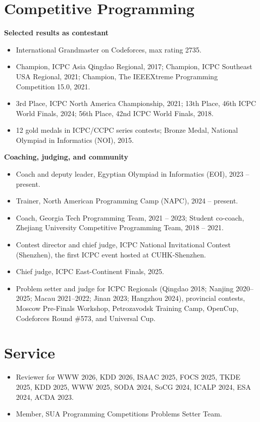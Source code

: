 \documentclass[10pt]{article}
\begin{document}
\section*{Competitive Programming}
\textbf{Selected results as contestant}
\begin{itemize}
  \item International Grandmaster on Codeforces, max rating 2735.
  \item Champion, ICPC Asia Qingdao Regional, 2017; Champion, ICPC Southeast USA Regional, 2021; Champion, The IEEEXtreme Programming Competition 15.0, 2021.
  \item 3rd Place, ICPC North America Championship, 2021; 13th Place, 46th ICPC World Finals, 2024; 56th Place, 42nd ICPC World Finals, 2018.
  \item 12 gold medals in ICPC/CCPC series contests; Bronze Medal, National Olympiad in Informatics (NOI), 2015.
\end{itemize}

\textbf{Coaching, judging, and community}
\begin{itemize}
  \item Coach and deputy leader, Egyptian Olympiad in Informatics (EOI), 2023 -- present.
  \item Trainer, North American Programming Camp (NAPC), 2024 -- present.
  \item Coach, Georgia Tech Programming Team, 2021 -- 2023; Student co-coach, Zhejiang University Competitive Programming Team, 2018 -- 2021.
  \item Contest director and chief judge, ICPC National Invitational Contest (Shenzhen), the first ICPC event hosted at CUHK-Shenzhen.
  \item Chief judge, ICPC East-Continent Finals, 2025.
  \item Problem setter and judge for ICPC Regionals (Qingdao 2018; Nanjing 2020--2025; Macau 2021--2022; Jinan 2023; Hangzhou 2024), provincial contests, Moscow Pre-Finals Workshop, Petrozavodsk Training Camp, OpenCup, Codeforces Round \#573, and Universal Cup.
\end{itemize}

\section*{Service}
\begin{itemize}
  \item Reviewer for WWW 2026, KDD 2026, ISAAC 2025, FOCS 2025, TKDE 2025, KDD 2025, WWW 2025, SODA 2024, SoCG 2024, ICALP 2024, ESA 2024, ACDA 2023.
  \item Member, SUA Programming Competitions Problems Setter Team.
\end{itemize}
\end{document}
